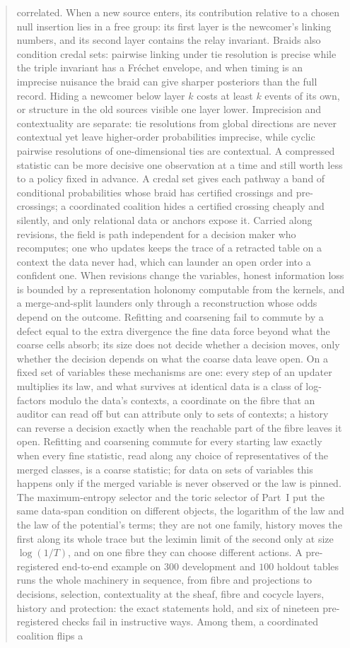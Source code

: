 \documentclass[11pt]{article}
\theoremstyle{definition}\newtheorem{definition}[theorem]{Definition}\newtheorem{remark}[theorem]{Remark}\newtheorem{example}[theorem]{Example}\newtheorem{problem}[theorem]{Open problem}\crefname{problem}{Problem}{Problems}
\begin{document}
\begin{abstract}
correlated. When a new source enters, its contribution relative to a chosen null insertion lies in a free group: its first layer is the newcomer's linking numbers, and its second layer contains the relay invariant. Braids also condition credal sets: pairwise linking under tie resolution is precise while the triple invariant has a Fr\'echet envelope, and when timing is an imprecise nuisance the braid can give sharper posteriors than the full record. Hiding a newcomer below layer $k$ costs at least $k$ events of its own, or structure in the old sources visible one layer lower. Imprecision and contextuality are separate: tie resolutions from global directions are never contextual yet leave higher-order probabilities imprecise, while cyclic pairwise resolutions of one-dimensional ties are contextual. A compressed statistic can be more decisive one observation at a time and still worth less to a policy fixed in advance. A credal set gives each pathway a band of conditional probabilities whose braid has certified crossings and pre-crossings; a coordinated coalition hides a certified crossing cheaply and silently, and only relational data or anchors expose it. Carried along revisions, the field is path independent for a decision maker who recomputes; one who updates keeps the trace of a retracted table on a context the data never had, which can launder an open order into a confident one. When revisions change the variables, honest information loss is bounded by a representation holonomy computable from the kernels, and a merge-and-split launders only through a reconstruction whose odds depend on the outcome. Refitting and coarsening fail to commute by a defect equal to the extra divergence the fine data force beyond what the coarse cells absorb; its size does not decide whether a decision moves, only whether the decision depends on what the coarse data leave open. On a fixed set of variables these mechanisms are one: every step of an updater multiplies its law, and what survives at identical data is a class of log-factors modulo the data's contexts, a coordinate on the fibre that an auditor can read off but can attribute only to sets of contexts; a history can reverse a decision exactly when the reachable part of the fibre leaves it open. Refitting and coarsening commute for every starting law exactly when every fine statistic, read along any choice of representatives of the merged classes, is a coarse statistic; for data on sets of variables this happens only if the merged variable is never observed or the law is pinned. The maximum-entropy selector and the toric selector of Part~I put the same data-span condition on different objects, the logarithm of the law and the law of the potential's terms; they are not one family, history moves the first along its whole trace but the leximin limit of the second only at size $\log(1/T)$, and on one fibre they can choose different actions. A pre-registered end-to-end example on $300$ development and $100$ holdout tables runs the whole machinery in sequence, from fibre and projections to decisions, selection, contextuality at the sheaf, fibre and cocycle layers, history and protection: the exact statements hold, and six of nineteen pre-registered checks fail in instructive ways. Among them, a coordinated coalition flips a 
\end{abstract}
\end{document}
